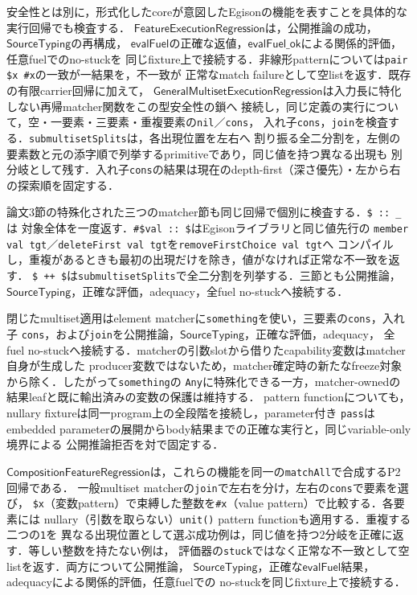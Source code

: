 安全性とは別に，形式化したcoreが意図したEgisonの機能を表すことを具体的な実行回帰でも検査する．
$\mathsf{FeatureExecutionRegression}$は，公開推論の成功，$\mathsf{SourceTyping}$の再構成，
$\mathsf{evalFuel}$の正確な返値，$\mathsf{evalFuel\_ok}$による関係的評価，任意fuelでのno-stuckを
同じfixture上で接続する．非線形patternについては\texttt{pair \$x \#x}の一致が一結果を，不一致が
正常なmatch failureとして空listを返す．既存の有限carrier回帰に加えて，
$\mathsf{GeneralMultisetExecutionRegression}$は入力長に特化しない再帰matcher関数をこの型安全性の鎖へ
接続し，同じ定義の実行について，空・一要素・三要素・重複要素の\texttt{nil}／\texttt{cons}，
入れ子\texttt{cons}，\texttt{join}を検査する．\texttt{submultisetSplits}は，各出現位置を左右へ
割り振る全二分割を，左側の要素数と元の添字順で列挙するprimitiveであり，同じ値を持つ異なる出現も
別分岐として残す．入れ子\texttt{cons}の結果は現在のdepth-first（深さ優先）・左から右の探索順を固定する．

論文3節の特殊化された三つのmatcher節も同じ回帰で個別に検査する．\texttt{\$ :: \_}は
対象全体を一度返す．\texttt{\#\$val :: \$}はEgisonライブラリと同じ値先行の
\texttt{member val tgt}／\texttt{deleteFirst val tgt}を\texttt{removeFirstChoice val tgt}へ
コンパイルし，重複があるときも最初の出現だけを除き，値がなければ正常な不一致を返す．
\texttt{\$ ++ \$}は\texttt{submultisetSplits}で全二分割を列挙する．三節とも公開推論，
$\mathsf{SourceTyping}$，正確な評価，adequacy，全fuel no-stuckへ接続する．

閉じたmultiset適用はelement matcherに\texttt{something}を使い，三要素の\texttt{cons}，入れ子
\texttt{cons}，および\texttt{join}を公開推論，$\mathsf{SourceTyping}$，正確な評価，adequacy，
全fuel no-stuckへ接続する．matcherの引数slotから借りたcapability変数はmatcher自身が生成した
producer変数ではないため，matcher確定時の新たなfreeze対象から除く．したがって\texttt{something}の
\texttt{Any}に特殊化できる一方，matcher-ownedの結果leafと既に輸出済みの変数の保護は維持する．
pattern functionについても，nullary fixtureは同一program上の全段階を接続し，parameter付き
\texttt{pass}はembedded parameterの展開からbody結果までの正確な実行と，同じvariable-only境界による
公開推論拒否を対で固定する．

$\mathsf{CompositionFeatureRegression}$は，これらの機能を同一の\texttt{matchAll}で合成するP2回帰である．
一般multiset matcherの\texttt{join}で左右を分け，左右の\texttt{cons}で要素を選び，
\texttt{\$x}（変数pattern）で束縛した整数を\texttt{\#x}（value pattern）で比較する．各要素には
nullary（引数を取らない）\texttt{unit()} pattern functionも適用する．重複する二つの\texttt{1}を
異なる出現位置として選ぶ成功例は，同じ値を持つ2分岐を正確に返す．等しい整数を持たない例は，
評価器の\texttt{stuck}ではなく正常な不一致として空listを返す．両方について公開推論，
$\mathsf{SourceTyping}$，正確な$\mathsf{evalFuel}$結果，adequacyによる関係的評価，任意fuelでの
no-stuckを同じfixture上で接続する．

